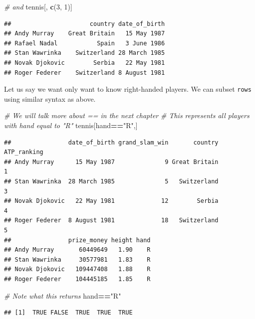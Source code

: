 \documentclass[12pt,]{krantz}
\newenvironment{Shaded}{\begin{snugshade}}{\end{snugshade}}
\newcommand{\KeywordTok}[1]{\textcolor[rgb]{0.27,0.27,0.27}{\textbf{#1}}}
\newcommand{\DecValTok}[1]{\textcolor[rgb]{0.06,0.06,0.06}{#1}}
\newcommand{\StringTok}[1]{\textcolor[rgb]{0.5,0.5,0.5}{#1}}
\newcommand{\CommentTok}[1]{\textcolor[rgb]{0.37,0.37,0.37}{\textit{#1}}}
\newcommand{\OperatorTok}[1]{\textcolor[rgb]{0.43,0.43,0.43}{\textbf{#1}}}
\newcommand{\NormalTok}[1]{#1}
\begin{document}
\begin{Shaded}
\begin{Highlighting}[]
\CommentTok{# and }
\NormalTok{tennis[, }\KeywordTok{c}\NormalTok{(}\DecValTok{3}\NormalTok{, }\DecValTok{1}\NormalTok{)]}
\end{Highlighting}
\end{Shaded}

\begin{verbatim}
##                      country date_of_birth
## Andy Murray    Great Britain   15 May 1987
## Rafael Nadal           Spain   3 June 1986
## Stan Wawrinka    Switzerland 28 March 1985
## Novak Djokovic        Serbia   22 May 1981
## Roger Federer    Switzerland 8 August 1981
\end{verbatim}

Let us say we want only want to know right-handed players. We can subset
\texttt{rows} using similar syntax as above.

\begin{Shaded}
\begin{Highlighting}[]
\CommentTok{# We will talk more about == in the next chapter}
\CommentTok{# This represents all players with hand equal to "R"}
\NormalTok{tennis[hand}\OperatorTok{==}\StringTok{"R"}\NormalTok{,]}
\end{Highlighting}
\end{Shaded}

\begin{verbatim}
##                date_of_birth grand_slam_win       country ATP_ranking
## Andy Murray      15 May 1987              9 Great Britain           1
## Stan Wawrinka  28 March 1985              5   Switzerland           3
## Novak Djokovic   22 May 1981             12        Serbia           4
## Roger Federer  8 August 1981             18   Switzerland           5
##                prize_money height hand
## Andy Murray       60449649   1.90    R
## Stan Wawrinka     30577981   1.83    R
## Novak Djokovic   109447408   1.88    R
## Roger Federer    104445185   1.85    R
\end{verbatim}

\begin{Shaded}
\begin{Highlighting}[]
\CommentTok{# Note what this returns }
\NormalTok{hand}\OperatorTok{==}\StringTok{"R"}
\end{Highlighting}
\end{Shaded}

\begin{verbatim}
## [1]  TRUE FALSE  TRUE  TRUE  TRUE
\end{verbatim}
\end{document}

